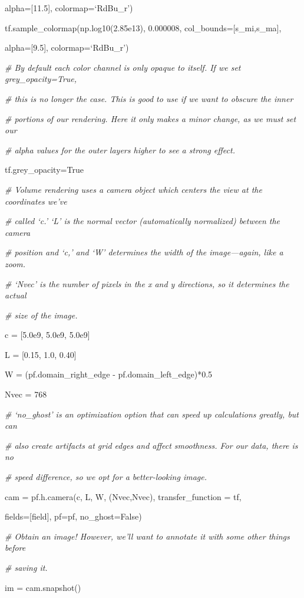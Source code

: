 {\setlength{\parindent}{96pt}alpha=[11.5], colormap=`RdBu\_r')}

tf.sample\_colormap(np.log10(2.85e13), 0.000008, col\_bounds=[s\_mi,s\_ma],

{\setlength{\parindent}{96pt}alpha=[9.5], colormap=`RdBu\_r')}

{\it\# By default each color channel is only opaque to itself. If  we set grey\_opacity=True,}
{\setlength{\parskip}{0pt}

{\it\# this is no longer the case. This is good to use if we want to obscure the inner}

{\it\# portions of our rendering. Here it only makes a minor change, as we must set our}

{\it\# alpha values for the outer layers higher to see a strong effect.}

tf.grey\_opacity=True
}

{\it\# Volume rendering uses a camera object which centers the view at the coordinates we've}
{\setlength{\parskip}{0pt}

{\it\# called `c.' `L' is the normal vector (automatically normalized) between the camera}

{\it\# position and `c,' and `W' determines the width of the image---again, like a zoom.}

{\it\# `Nvec' is the number of pixels in the x and y directions, so it determines the actual} 

{\it\# size of the image.}

c = [5.0e9, 5.0e9, 5.0e9]
}

L = [0.15, 1.0, 0.40]

W = (pf.domain\_right\_edge - pf.domain\_left\_edge)*0.5

Nvec = 768

{\it\# `no\_ghost' is an optimization option that can speed up calculations greatly, but can}
{\setlength{\parskip}{0pt}

{\it\# also create artifacts at grid edges and affect smoothness.  For our data, there is no}

{\it\# speed difference, so we opt for a better-looking image.}

cam = pf.h.camera(c, L, W, (Nvec,Nvec), transfer\_function = tf,
}

{\setlength{\parindent}{95pt}fields=[field], pf=pf, no\_ghost=False)}

{\it\# Obtain an image! However, we'll want to annotate it with some other things before}
{\setlength{\parskip}{0pt}

{\it\# saving it.}

im = cam.snapshot()
}

